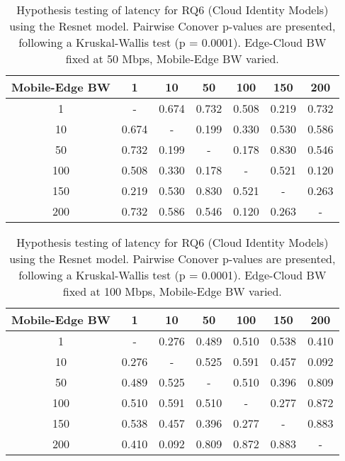 \begin{table}[H]
\caption{Hypothesis testing of latency for RQ6 (Cloud Identity Models) using the Resnet model. Pairwise Conover p-values are presented, following a Kruskal-Wallis test (p = 0.0001). Edge-Cloud BW fixed at 50 Mbps, Mobile-Edge BW varied.}
\centering
\begin{tabular}{c|cccccc}
Mobile-Edge BW & 1 & 10 & 50 & 100 & 150 & 200 \\
\hline
1 & - & 0.674 & 0.732 & 0.508 & 0.219 & 0.732 \\
10 & 0.674 & - & 0.199 & 0.330 & 0.530 & 0.586 \\
50 & 0.732 & 0.199 & - & 0.178 & 0.830 & 0.546 \\
100 & 0.508 & 0.330 & 0.178 & - & 0.521 & 0.120 \\
150 & 0.219 & 0.530 & 0.830 & 0.521 & - & 0.263 \\
200 & 0.732 & 0.586 & 0.546 & 0.120 & 0.263 & - \\
\end{tabular}
\end{table}

\begin{table}[H]
\caption{Hypothesis testing of latency for RQ6 (Cloud Identity Models) using the Resnet model. Pairwise Conover p-values are presented, following a Kruskal-Wallis test (p = 0.0001). Edge-Cloud BW fixed at 100 Mbps, Mobile-Edge BW varied.}
\centering
\begin{tabular}{c|cccccc}
Mobile-Edge BW & 1 & 10 & 50 & 100 & 150 & 200 \\
\hline
1 & - & 0.276 & 0.489 & 0.510 & 0.538 & 0.410 \\
10 & 0.276 & - & 0.525 & 0.591 & 0.457 & 0.092 \\
50 & 0.489 & 0.525 & - & 0.510 & 0.396 & 0.809 \\
100 & 0.510 & 0.591 & 0.510 & - & 0.277 & 0.872 \\
150 & 0.538 & 0.457 & 0.396 & 0.277 & - & 0.883 \\
200 & 0.410 & 0.092 & 0.809 & 0.872 & 0.883 & - \\
\end{tabular}
\end{table}

